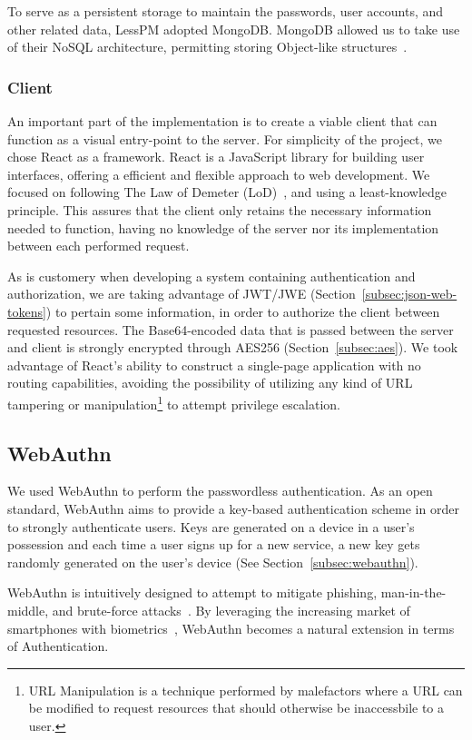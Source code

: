 To serve as a persistent storage to maintain the passwords, user accounts,
and other related data, LessPM adopted MongoDB\@.
MongoDB allowed us to take use of their NoSQL architecture, permitting
storing Object-like structures~\cite{mongodb2021nosql}.

\subsubsection{Client}
An important part of the implementation is to create a viable client that can
function as a visual entry-point to the server.
For simplicity of the project, we chose React as a framework.
React is a JavaScript library for building user interfaces, offering a
efficient and flexible approach to web development.
We focused on following The Law of Demeter (LoD)~\cite{lieberherr1990assuring},
and using a least-knowledge principle.
This assures that the client only retains the necessary information needed to
function, having no knowledge of the server nor its implementation between each
performed request.

As is customery when developing a system containing authentication and
authorization, we are taking advantage of JWT/JWE
(Section~\ref{subsec:json-web-tokens})
to pertain some information, in order to authorize the client between
requested resources.
The Base64-encoded data that is passed between the server and client is
strongly encrypted through AES256 (Section~\ref{subsec:aes}).
We took advantage of React's ability to construct a single-page application with
no routing capabilities, avoiding the possibility of utilizing any kind of URL
tampering or manipulation\footnote{
  URL Manipulation is a technique performed by malefactors where a URL can be
  modified to request resources that should otherwise be inaccessbile to a user.
} to attempt privilege escalation.

\subsection{WebAuthn}\label{subsec:webauthn-methodology}
We used WebAuthn to perform the passwordless authentication.
As an open standard, WebAuthn aims to provide a key-based authentication
scheme in order to strongly authenticate users.
Keys are generated on a device in a user's possession and each time a
user signs up for a new service, a new key gets randomly generated on the
user's device (See Section~\ref{subsec:webauthn}).

WebAuthn is intuitively designed to attempt to mitigate phishing,
man-in-the-middle, and brute-force attacks~\cite{webauthn_level_2}.
By leveraging the increasing market of smartphones with
biometrics~\cite{statista-biometric-transactions}, WebAuthn becomes a natural
extension in terms of Authentication.

